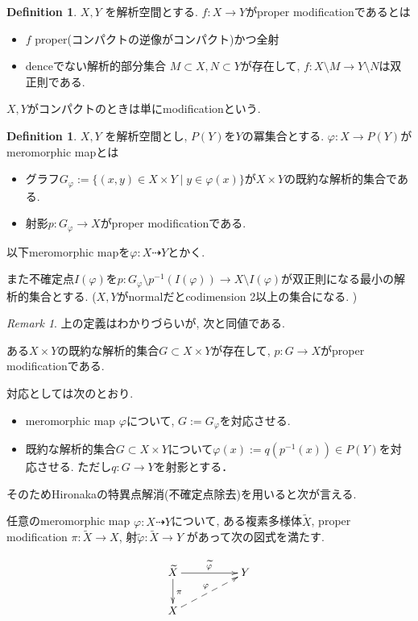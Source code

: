 \documentclass[dvipdfmx,a4paper,11pt]{article} %
\theoremstyle{definition}
\newtheorem{defn}[thm]{Definition}
\theoremstyle{remark}
\newtheorem{rem}[thm]{Remark}
\numberwithin{equation}{section}
\begin{document}
\begin{defn}\cite[Definition 2.1]{Uen75}
\(X, Y\) を解析空間とする. 
$f : X \to Y$がproper modificationであるとは
\begin{itemize}
\item $f$ proper(コンパクトの逆像がコンパクト)かつ全射
\item denceでない解析的部分集合 $M \subset X, N \subset Y$が存在して, $f : X \setminus M \to Y \setminus N$は双正則である.
\end{itemize}
$X, Y$がコンパクトのときは単にmodificationという. 
\end{defn}


\begin{defn}\cite[Definition 2.2]{Uen75}
\label{defn-Ueno-2.2}
\(X, Y\) を解析空間とし, $P(Y)$を$Y$の冪集合とする. 
$\varphi : X \to P(Y)$がmeromorphic mapとは
\begin{itemize}
\item グラフ$G_{\varphi} :=\{ (x, y) \in X \times Y\mid y \in \varphi(x) \} $が$X \times Y$の既約な解析的集合である. 
\item 射影$p : G_{\varphi} \to X$がproper modificationである.  
\end{itemize}
以下meromorphic mapを$\varphi : X \dashrightarrow Y$とかく. 

また不確定点$I(\varphi)$を$p : G_{\varphi} \setminus p^{-1}(I(\varphi)) \to X \setminus I(\varphi)$が双正則になる最小の解析的集合とする. ($X,Y$がnormalだとcodimension 2以上の集合になる. \cite[Theorem 2.5]{Uen75})
\end{defn}


\begin{rem}
\label{rem-Ueno-2.2}
上の定義はわかりづらいが, 次と同値である. 

ある$X \times Y$の既約な解析的集合$G \subset X \times Y$が存在して, $p : G \to X$がproper modificationである. 

対応としては次のとおり.
\begin{itemize}
\item meromorphic map $\varphi$について, $G:=G_{\varphi}$を対応させる.
\item  既約な解析的集合$G \subset X \times Y$について$\varphi(x):=q (p^{-1}(x)) \in P(Y)$を対応させる. ただし$q : G \to Y$を射影とする． 
\end{itemize}

そのためHironakaの特異点解消(不確定点除去)を用いると次が言える. 

任意のmeromorphic map $\varphi : X \dashrightarrow Y$について, ある複素多様体$\widetilde{X}$, 
proper modification $\pi : \widetilde{X} \to X$, 射$\widetilde{\varphi} : \widetilde{X} \to Y$
があって次の図式を満たす. 

   \[
\xymatrix@C=50pt@R=20pt{
\widetilde{X} \ar@{->}[r]^{\widetilde{\varphi}}\ar@{->}[d]^{\pi} &Y\\
X \ar@{-->}[ru]^{\varphi}  & \\
}
\]

\end{rem}
\end{document}
